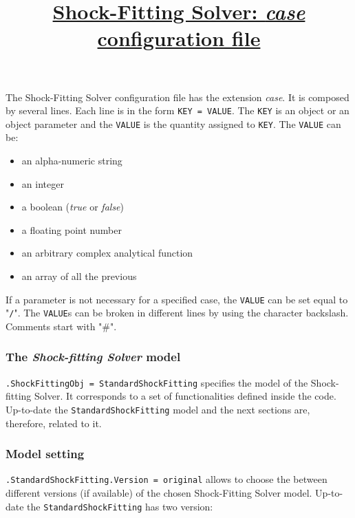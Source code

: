 \documentclass[11pt,a4paper,oneside]{article}
\begin{document}
\title{\underline{Shock-Fitting Solver: \textit{case} configuration file}}
\date{}
\maketitle
The Shock-Fitting Solver configuration file has the extension \textit{case}. 
It is composed by several lines. 
Each line is in the form \texttt{KEY = VALUE}.
The \texttt{KEY} is an object or an object parameter and the \texttt{VALUE} is the quantity assigned to \texttt{KEY}.
\newline
\newline
The \texttt{VALUE} can be:

\begin{itemize}
\item{an alpha-numeric string}
\item{an integer}
\item{a boolean (\textit{true} or \textit{false})}
\item{a floating point number}
\item{an arbitrary complex analytical function}
\item{an array of all the previous}
\end{itemize}

If a parameter is not necessary for a specified case, the \texttt{VALUE} can be set equal to "\texttt{/}".
The \texttt{VALUE}s can be broken in different lines by using the character backslash.
Comments start with "\#".


\subsubsection*{The \textit{Shock-fitting Solver} model}

\hspace*{1cm} \texttt{.ShockFittingObj = StandardShockFitting}
\newline
\newline
specifies the model of the Shock-fitting Solver. It corresponds to a set of functionalities defined inside the code.
Up-to-date the \texttt{StandardShockFitting} model and the next sections are, therefore, related to it.

\subsubsection*{Model setting}

\hspace*{1cm} \texttt{.StandardShockFitting.Version = original}
\newline
\newline
allows to choose the between different versions (if available) of the chosen Shock-Fitting Solver model. 
\newline
Up-to-date the \texttt{StandardShockFitting} has two version:
\end{document}
